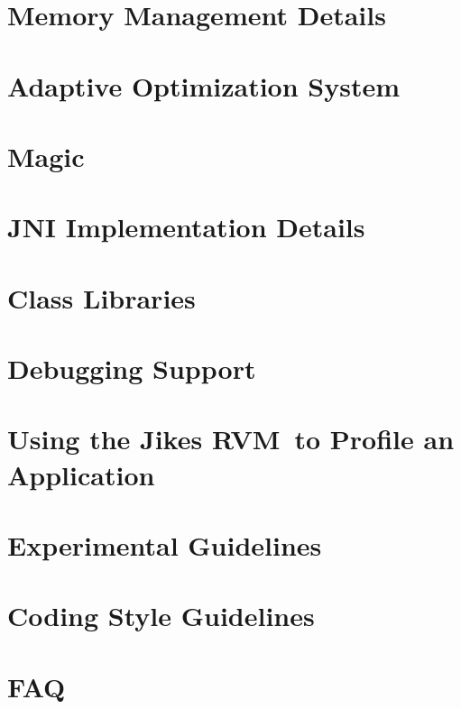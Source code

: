 \documentclass{article}
\newcommand{\jrvm}{Jikes RVM}
\begin{document}
\T \newpage
\section{Memory Management Details}


\T \newpage
\section{Adaptive Optimization System}
\label{section:aosdetails}


\T \newpage
\section{Magic}


\T \newpage
\section{JNI Implementation Details}
\label{section:jni}


\T \newpage
\section{Class Libraries}
\label{section:libraries}


\T \newpage
\section{Debugging Support}
\label{section:debugging}


\T \newpage
\section{Using the \jrvm\ to Profile an Application}


\T \newpage
\section{Experimental Guidelines}


\T \newpage
\section{Coding Style Guidelines}


\T \newpage
\section{FAQ}

\end{document}
